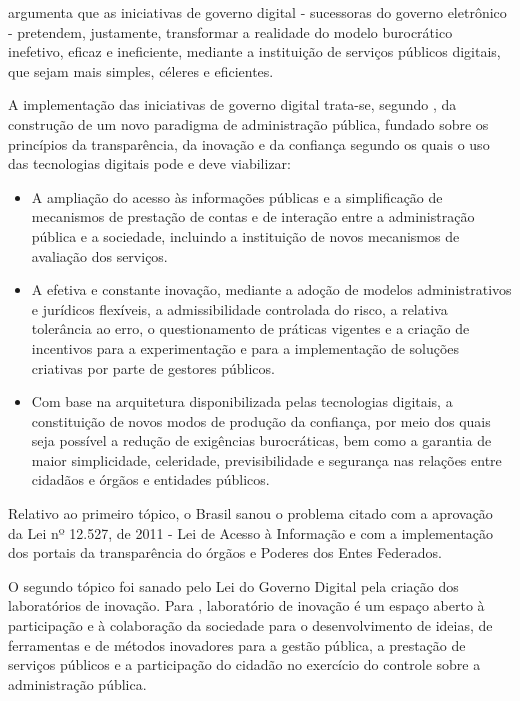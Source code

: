 \cite{de2020governo} argumenta que as iniciativas de governo digital - sucessoras do governo eletrônico - pretendem, justamente, transformar a realidade do modelo burocrático inefetivo, eficaz  e ineficiente, mediante a instituição de serviços públicos digitais, que sejam mais simples, céleres e eficientes.

A implementação das iniciativas de governo digital trata-se, segundo \cite{de2020governo}, da construção de um novo paradigma  de administração pública, fundado sobre os princípios da transparência, da inovação e da confiança  segundo os quais o uso das tecnologias digitais pode e deve viabilizar: 

\begin{itemize}
    \item A ampliação do acesso às informações públicas e a simplificação de 
    mecanismos de prestação de contas e de interação entre a administração 
    pública e a sociedade, incluindo a instituição de novos mecanismos de 
    avaliação dos serviços.
    \item A efetiva e constante inovação, mediante a adoção de modelos 
    administrativos e jurídicos flexíveis, a admissibilidade controlada do risco, a relativa tolerância ao erro, o questionamento de práticas vigentes e a criação de incentivos para a experimentação e para a implementação de soluções criativas por parte de gestores públicos.
    \item Com base na arquitetura disponibilizada pelas tecnologias digitais, a constituição de novos modos de produção da confiança, por meio dos quais seja possível a redução de exigências burocráticas, bem como a garantia de maior simplicidade, celeridade, previsibilidade e segurança nas relações entre cidadãos e órgãos e entidades públicos.
\end{itemize}

Relativo ao primeiro tópico, o Brasil sanou o problema citado com a aprovação da Lei nº 12.527, de 2011 - Lei de Acesso à Informação e com a implementação dos portais da transparência do órgãos e Poderes dos Entes Federados.

O segundo tópico foi sanado pelo Lei do Governo Digital pela criação dos laboratórios de inovação. Para \cite{l14129}, laboratório de inovação é um espaço aberto à participação e à colaboração da sociedade para o desenvolvimento de ideias, de ferramentas e de métodos inovadores para a gestão pública, a prestação de serviços públicos e a participação do cidadão no exercício do controle sobre a administração pública.

